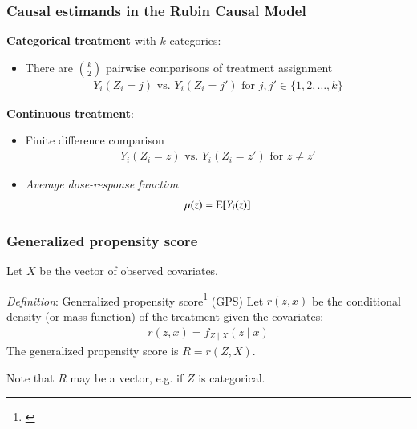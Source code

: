 \begin{frame}
  \frametitle{Causal estimands in the Rubin Causal Model}

  \textbf{Categorical treatment} with $k$ categories: \medskip

  \begin{itemize}
  \item There are $\binom{k}{2}$ pairwise comparisons of treatment assignment
    \begin{align*}
      Y_i(Z_i = j) \text{ vs. } Y_i(Z_i = {j'}) \text{ for } j,j'\in \{1,2,\ldots,k\}
    \end{align*}
  \end{itemize}
  
  \textbf{Continuous treatment}: \medskip 
  \begin{itemize}
  \item Finite difference comparison
    \begin{align*} 
      Y_i(Z_i = z) \text{ vs. } Y_i(Z_i = z') \text{ for } z \neq z'
    \end{align*}
  \item \textit{Average dose-response function}
    \begin{align*}
      \mu(z) = \mathrm{E}[Y_i(z)]
    \end{align*}
  \end{itemize}
  
\end{frame}


\begin{frame}
  \frametitle{Generalized propensity score}
  
  Let $X$ be the vector of observed covariates. \bigskip 






  \begin{block}{\textit{Definition}: Generalized propensity score\footnote{\cite{Imbens2000,Hirano2004}} (GPS)}
    Let $r(z,x)$ be the conditional density (or mass function) of the
    treatment given the covariates:
    \begin{align*}
      r(z, x) = f_{Z \mid X}(z \mid x)
    \end{align*}
    The generalized propensity score is $R = r(Z, X)$. 
  \end{block}

  \bigskip

  Note that $R$ may be a vector, e.g. if $Z$ is categorical. 

\end{frame}


